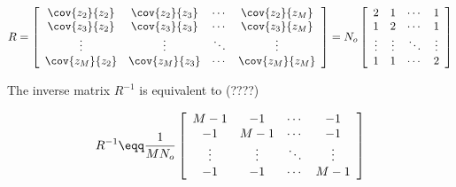 \begin{theorem}
\[
   R = 
   \left[
   \begin{array}{cccc}
      \cov{z_2}{z_2}  & \cov{z_2}{z_3} & \cdots & \cov{z_2}{z_M}  \\
      \cov{z_3}{z_2}  & \cov{z_3}{z_3} & \cdots & \cov{z_3}{z_M}  \\
      \vdots          & \vdots         & \ddots & \vdots          \\
      \cov{z_M}{z_2}  & \cov{z_M}{z_3} & \cdots & \cov{z_M}{z_M}  
   \end{array}
   \right]
   = 
   N_o \left[
   \begin{array}{cccc} 
      2      & 1      &  \cdots &  1     \\
      1      & 2      &  \cdots &  1     \\
      \vdots & \vdots &  \ddots & \vdots \\
      1      & 1      &  \cdots &  2  
   \end{array}
   \right]
\]


The inverse matrix $R^{-1}$ is equivalent to (????) \attention

\[
   R^{-1} \eqq
   \frac{1}{MN_o} \left[
   \begin{array}{cccc} 
      M-1     & -1      &  \cdots &  -1     \\
      -1      & M-1     &  \cdots &  -1     \\
      \vdots  & \vdots  &  \ddots & \vdots  \\
      -1      & -1      &  \cdots & M-1
   \end{array}
   \right]
\]
\end{theorem}



